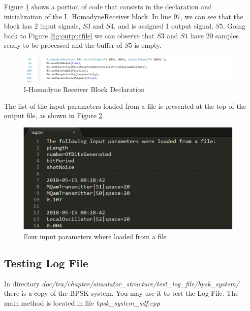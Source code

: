 \begin{refsection}
Figure \ref{fig:homodynesignals} shows a portion of code that consists in the declaration and inicialization of the I\_HomodyneReceiver block. In line 97, we can see that the block has 2 input signals, $S3$ and $S4$, and is assigned 1 output signal, $S5$. Going back to Figure \ref{fig:outputfile} we can observe that $S3$ and $S4$ have 20 samples ready to be processed and the buffer of $S5$ is empty.

\renewcommand{\figurename}{Figure}
\begin{figure}[H]
\centering
\includegraphics[width=1.3\linewidth]{./chapter/simulator_structure/figures/homodyne_signals}
\caption{I-Homodyne Receiver Block Declaration}
\label{fig:homodynesignals}
\end{figure}

The list of the input parameters loaded from a file is presented at the top of the output file, as shown in Figure \ref{fig:changedinputparameters}.

\begin{figure}[H]
\centering
\includegraphics[width=.50\linewidth]{./chapter/simulator_structure/figures/logfile_input_parameters_changed}
\caption{Four input parameters where loaded from a file}
\label{fig:changedinputparameters}
\end{figure}

\subsection{Testing Log File}
In directory \textit{doc/tex/chapter/simulator\_structure/test\_log\_file/bpsk\_system/} there is a copy of the BPSK system. You may use it to test the Log File. The main method is located in file \textit{bpsk\_system\_sdf.cpp}

\clearpage
\printbibliography[heading=subbibliography]
\end{refsection}
